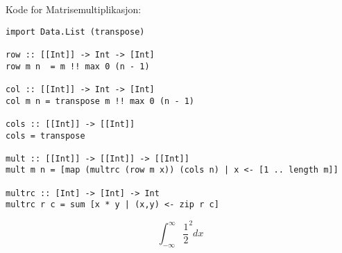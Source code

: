 \documentclass{article}
\begin{document}
    \begin{ans}
        Kode for Matrisemultiplikasjon:
        \begin{lstlisting}
import Data.List (transpose)

row :: [[Int]] -> Int -> [Int]
row m n  = m !! max 0 (n - 1)

col :: [[Int]] -> Int -> [Int]
col m n = transpose m !! max 0 (n - 1)

cols :: [[Int]] -> [[Int]]
cols = transpose

mult :: [[Int]] -> [[Int]] -> [[Int]]
mult m n = [map (multrc (row m x)) (cols n) | x <- [1 .. length m]]

multrc :: [Int] -> [Int] -> Int
multrc r c = sum [x * y | (x,y) <- zip r c]
        \end{lstlisting}
    \end{ans}


    \[ \int_{-\infty}^{\infty} \frac{1}{2} ^2  dx \]
\end{document}
